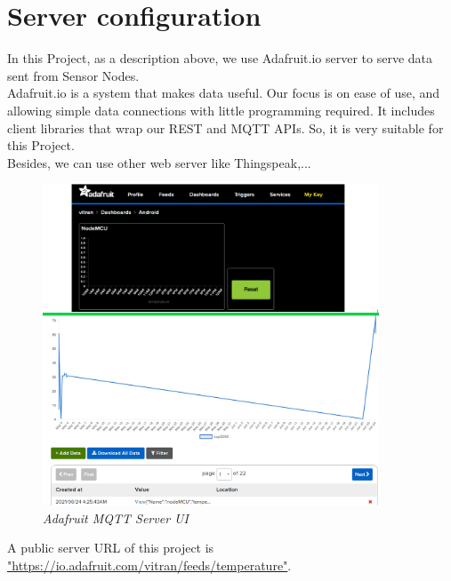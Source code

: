 \documentclass[13pt,a4paper]{article}
\begin{document}
	\section{Server configuration}
	In this Project, as a description above, we use Adafruit.io server to serve data sent from Sensor Nodes. \\
	Adafruit.io is a system that makes data useful. Our focus is on ease of use, and allowing simple data connections with little programming required. It includes client libraries that wrap our REST and MQTT APIs. So, it is very suitable for this Project. \\
	Besides, we can use other web server like Thingspeak,... \\
	 \begin{figure}[h!]
	 	\begin{center}
	 		\includegraphics[width=10cm]{adafruit.png}
	 		\caption{\textit{Adafruit MQTT Server UI}}
	 	\end{center}
	 \end{figure}
	A public server URL of this project is \url{"https://io.adafruit.com/vitran/feeds/temperature"}.
\end{document}
